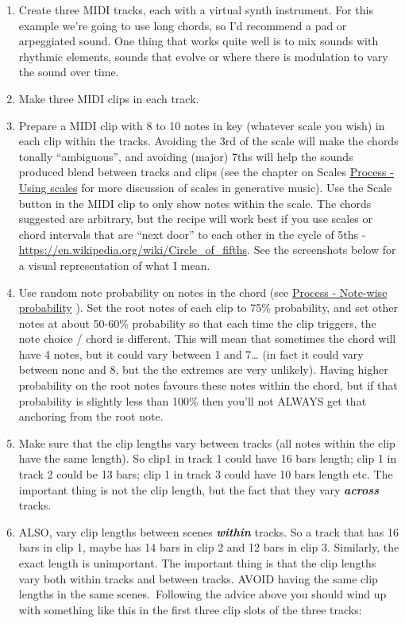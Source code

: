 \documentclass[
  12pt,
  letterpaper,
  oneside,
  open=any]{scrbook}
\begin{document}
\begin{enumerate}
\def\labelenumi{\arabic{enumi}.}
\item
  Create three MIDI tracks, each with a virtual synth instrument. For
  this example we're going to use long chords, so I'd recommend a pad or
  arpeggiated sound. One thing that works quite well is to mix sounds
  with rhythmic elements, sounds that evolve or where there is
  modulation to vary the sound over time.
\item
  Make three MIDI clips in each track.
\item
  Prepare a MIDI clip with 8 to 10 notes in key (whatever scale you
  wish) in each clip within the tracks. Avoiding the 3rd of the scale
  will make the chords tonally ``ambiguous'', and avoiding (major) 7ths
  will help the sounds produced blend between tracks and clips (see the
  chapter on Scales \hyperref[Chapter-018-Process-Scales]{Process -
  Using scales} for more discussion of scales in generative music). Use
  the Scale button in the MIDI clip to only show notes within the scale.
  The chords suggested are arbitrary, but the recipe will work best if
  you use scales or chord intervals that are ``next door'' to each other
  in the cycle of 5ths -
  \url{https://en.wikipedia.org/wiki/Circle_of_fifths}. See the
  screenshots below for a visual representation of what I mean.
\item
  Use random note probability on notes in the chord (see
  \hyperref[Chapter-002-Process-Note_wise_probability]{Process -
  Note-wise probability} ). Set the root notes of each clip to 75\%
  probability, and set other notes at about 50-60\% probability so that
  each time the clip triggers, the note choice / chord is different.
  This will mean that sometimes the chord will have 4 notes, but it
  could vary between 1 and 7\ldots{} (in fact it could vary between none
  and 8, but the the extremes are very unlikely). Having higher
  probability on the root notes favours these notes within the chord,
  but if that probability is slightly less than 100\% then you'll not
  ALWAYS get that anchoring from the root note.
\item
  Make sure that the clip lengths vary between tracks (all notes within
  the clip have the same length). So clip1 in track 1 could have 16 bars
  length; clip 1 in track 2 could be 13 bars; clip 1 in track 3 could
  have 10 bars length etc. The important thing is not the clip length,
  but the fact that they vary \textbf{\emph{across}} tracks.
\item
  ALSO, vary clip lengths between scenes \textbf{\emph{within}} tracks.
  So a track that has 16 bars in clip 1, maybe has 14 bars in clip 2 and
  12 bars in clip 3. Similarly, the exact length is unimportant. The
  important thing is that the clip lengths vary both within tracks and
  between tracks. AVOID having the same clip lengths in the same
  scenes.~Following the advice above you should wind up with something
  like this in the first three clip slots of the three tracks:
\end{enumerate}
\end{document}
